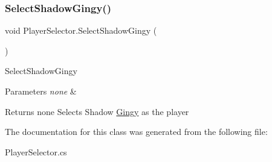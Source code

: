 \subsubsection{\texorpdfstring{Select\+Shadow\+Gingy()}{SelectShadowGingy()}}
{\footnotesize\ttfamily void Player\+Selector.\+Select\+Shadow\+Gingy (\begin{DoxyParamCaption}{ }\end{DoxyParamCaption})\hspace{0.3cm}{\ttfamily [inline]}}

Select\+Shadow\+Gingy 
\begin{DoxyParams}{Parameters}
{\em none} & \\
\hline
\end{DoxyParams}
\begin{DoxyReturn}{Returns}
none Selects Shadow \mbox{\hyperlink{class_gingy}{Gingy}} as the player 
\end{DoxyReturn}


The documentation for this class was generated from the following file\+:\begin{DoxyCompactItemize}
\item 
Player\+Selector.\+cs\end{DoxyCompactItemize}
